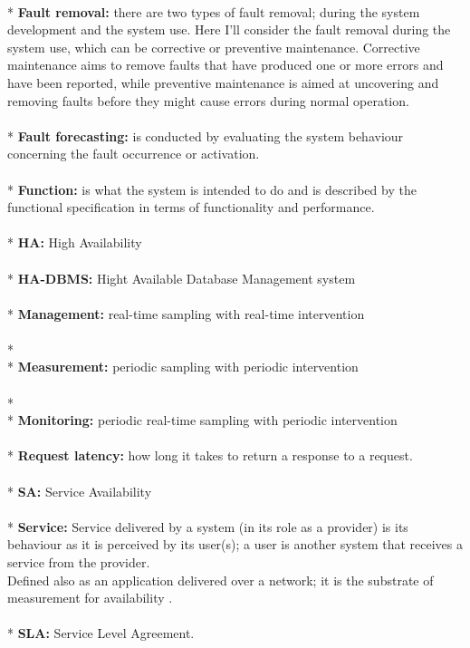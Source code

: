\documentclass[english]{tktltiki2}
\theoremstyle{definition}
\theoremstyle{remark}
\begin{document}
\\*
\textbf{Fault removal:} there are two types of fault removal; during the system development and the system use. Here I’ll consider the fault removal during the system use, which can be corrective or preventive maintenance. Corrective maintenance aims to remove faults that have produced one or more errors and have been reported, while preventive maintenance is aimed at uncovering and removing faults before they might cause errors during normal operation.\\
\\*
\textbf{Fault forecasting:} is conducted by evaluating the system behaviour concerning the fault occurrence or activation.\\
\\*
\textbf{Function:} is what the system is intended to do and is described
by the functional specification in terms of functionality and performance.\\
\\*
 \textbf{HA:} High Availability\\
\\*
\textbf{HA-DBMS:} Hight Available Database Management system\\
\\*
\textbf{Management:} real-time sampling with real-time intervention\\
\\*
\\*
\textbf{Measurement:} periodic sampling with periodic intervention\\
\\*
\\*
\textbf{Monitoring:} periodic real-time sampling with periodic intervention\\
\\*
\textbf{Request latency:} how long it takes to return a response to a request.\\
\\*
\textbf{SA:} Service Availability\\
\\*
\textbf{Service:} Service delivered by a system (in its role as a provider) is its behaviour as it is perceived by its user(s); a user is another system that receives a service from the provider.\\
Defined also as an application delivered over a network; it is the
substrate of measurement for availability \cite{AAMES}.\\
\\*
\textbf{SLA:} Service Level Agreement.\\
\end{document}
